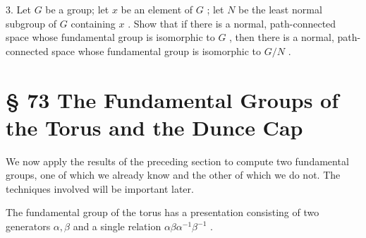 3. Let \(G\) be a group; let \(x\) be an element of \(G\) ; let \(N\) be the least normal subgroup of \(G\) containing \(x\) . Show that if there is a normal, path-connected space whose fundamental group is isomorphic to \(G\) , then there is a normal, path-connected space whose fundamental group is isomorphic to \(G/N\) .

\section*{§ 73 The Fundamental Groups of the Torus and the Dunce Cap}

We now apply the results of the preceding section to compute two fundamental groups, one of which we already know and the other of which we do not. The techniques involved will be important later.

\begin{theorem} The fundamental group of the torus has a presentation consisting of two generators \(\alpha ,\beta\) and a single relation \({\alpha \beta }{\alpha }^{-1}{\beta }^{-1}\) .
\end{theorem}

